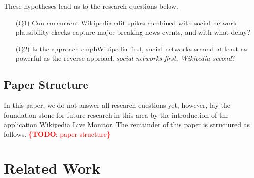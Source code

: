 \documentclass{sig-alternate}
\newcommand{\todo}[1]{\noindent\textcolor{red}{{\bf \{TODO}: #1{\bf \}}}}
\begin{document}
These hypotheses lead us to the research questions below.

\begin{itemize}
  \itemsep0em
  \item[(Q1)] Can concurrent Wikipedia edit spikes combined with
    social network plausibility checks capture major breaking news events,
    and with what delay?
  \item[(Q2)] Is the approach emph{Wikipedia first, social networks second}
    at least as powerful as the reverse approach \emph{social networks first,
    Wikipedia second}?
\end{itemize}

\subsection{Paper Structure}
In this paper, we do not answer all research questions yet,
however, lay the foundation stone for future research in this area
by the introduction of the application Wikipedia Live Monitor.
The remainder of this paper is structured as follows.
\todo{paper structure}

\section{Related Work}
\end{document}
